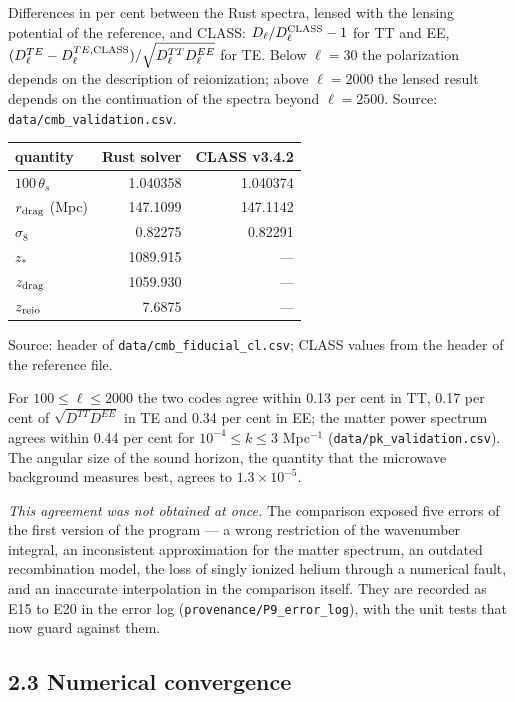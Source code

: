 \documentclass[
  10pt,
]{article}
\begin{document}
Differences in per cent between the Rust spectra, lensed with the
lensing potential of the reference, and CLASS:
\(D_\ell/D_\ell^{\rm CLASS}-1\) for TT and EE,
\((D_\ell^{TE}-D_\ell^{TE,\rm CLASS})/\sqrt{D_\ell^{TT}D_\ell^{EE}}\)
for TE. Below \(\ell=30\) the polarization depends on the description of
reionization; above \(\ell=2000\) the lensed result depends on the
continuation of the spectra beyond \(\ell=2500\). Source:
\texttt{data/cmb\_validation.csv}.

\begin{longtable}[]{@{}lrr@{}}
\toprule\noalign{}
quantity & Rust solver & CLASS v3.4.2 \\
\midrule\noalign{}
\endhead
\bottomrule\noalign{}
\endlastfoot
\(100\,\theta_s\) & 1.040358 & 1.040374 \\
\(r_{\rm drag}\) (Mpc) & 147.1099 & 147.1142 \\
\(\sigma_8\) & 0.82275 & 0.82291 \\
\(z_*\) & 1089.915 & --- \\
\(z_{\rm drag}\) & 1059.930 & --- \\
\(z_{\rm reio}\) & 7.6875 & --- \\
\end{longtable}

Source: header of \texttt{data/cmb\_fiducial\_cl.csv}; CLASS values from
the header of the reference file.

For \(100\le\ell\le2000\) the two codes agree within 0.13 per cent in
TT, 0.17 per cent of \(\sqrt{D^{TT}D^{EE}}\) in TE and 0.34 per cent in
EE; the matter power spectrum agrees within 0.44 per cent for
\(10^{-4}\le k\le3\) Mpc\(^{-1}\) (\texttt{data/pk\_validation.csv}).
The angular size of the sound horizon, the quantity that the microwave
background measures best, agrees to \(1.3\times10^{-5}\).

\emph{This agreement was not obtained at once.} The comparison exposed
five errors of the first version of the program --- a wrong restriction
of the wavenumber integral, an inconsistent approximation for the matter
spectrum, an outdated recombination model, the loss of singly ionized
helium through a numerical fault, and an inaccurate interpolation in the
comparison itself. They are recorded as E15 to E20 in the error log
(\texttt{provenance/P9\_error\_log}), with the unit tests that now guard
against them.

\hypertarget{numerical-convergence}{%
\subsection{2.3 Numerical convergence}\label{numerical-convergence}}
\end{document}
